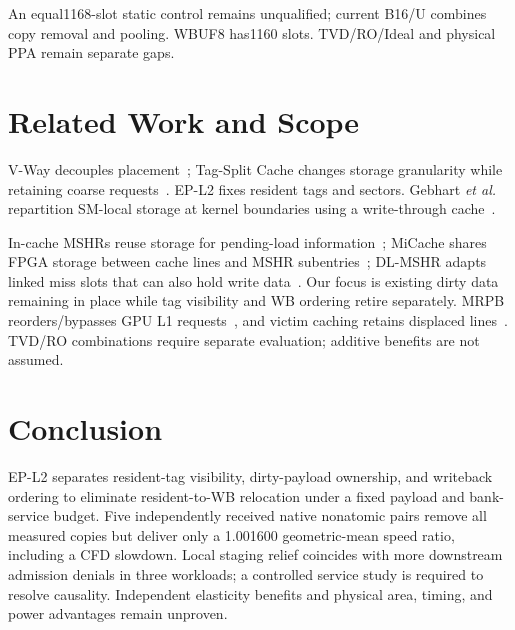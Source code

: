 \documentclass[conference,letterpaper]{IEEEtran}
\newcommand{\epl}{EP-L2}
\begin{document}
An equal1168-slot static control remains unqualified; current B16/U combines copy removal and pooling. WBUF8 has1160 slots. TVD/RO/Ideal and physical PPA remain separate gaps.

\section{Related Work and Scope}
V-Way decouples placement~\cite{vway}; Tag-Split Cache changes storage granularity while retaining coarse requests~\cite{tsc}. \epl{} fixes resident tags and sectors. Gebhart \emph{et al.} repartition SM-local storage at kernel boundaries using a write-through cache~\cite{unified}.

In-cache MSHRs reuse storage for pending-load information~\cite{farkas}; MiCache shares FPGA storage between cache lines and MSHR subentries~\cite{micache}; DL-MSHR adapts linked miss slots that can also hold write data~\cite{dlmshr}. Our focus is existing dirty data remaining in place while tag visibility and WB ordering retire separately. MRPB reorders/bypasses GPU L1 requests~\cite{mrpb}, and victim caching retains displaced lines~\cite{victim}. TVD/RO combinations require separate evaluation; additive benefits are not assumed.

\section{Conclusion}
\epl{} separates resident-tag visibility, dirty-payload ownership, and writeback ordering to eliminate resident-to-WB relocation under a fixed payload and bank-service budget. Five independently received native nonatomic pairs remove all measured copies but deliver only a 1.001600 geometric-mean speed ratio, including a CFD slowdown. Local staging relief coincides with more downstream admission denials in three workloads; a controlled service study is required to resolve causality. Independent elasticity benefits and physical area, timing, and power advantages remain unproven.
\end{document}
